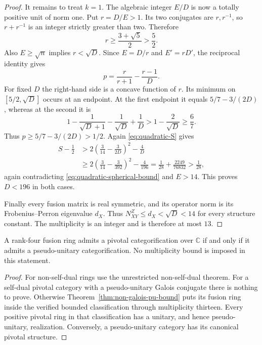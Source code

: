 \begin{proof}
It remains to treat $k=1$. The algebraic integer $E/D$ is now a
totally positive unit of norm one. Put $r=D/E>1$.
Its two conjugates are $r,r^{-1}$, so $r+r^{-1}$ is an integer
strictly greater than two. Therefore
\[
 r\geq\frac{3+\sqrt5}{2}>\frac52.
\]
Also $E\geq\sqrt n$ implies $r<\sqrt D$. Since $E=D/r$ and
$E'=rD'$, the reciprocal identity gives
\[
 p=\frac r{r+1}-\frac{r-1}{D}.
\]
For fixed $D$ the right-hand side is a concave function of $r$.
Its minimum on $[5/2,\sqrt D]$ occurs at an endpoint. At the first
endpoint it equals $5/7-3/(2D)$, whereas at the second it is
\[
 1-\frac1{\sqrt D+1}-\frac1{\sqrt D}+\frac1D
 >1-\frac2{\sqrt D}\geq\frac67.
\]
Thus $p\geq5/7-3/(2D)>1/2$. Again
\eqref{eq:quadratic-S} gives
\begin{align*}
 S-\tfrac12
 &>2\left(\frac3{14}-\frac3{2D}\right)^2-\frac4D\\
 &\geq2\left(\frac3{14}-\frac3{392}\right)^2-\frac4{196}
    =\frac1{28}+\frac{2249}{76832}>\frac1{28},
\end{align*}
again contradicting \eqref{eq:quadratic-spherical-bound} and $E>14$.
This proves $D<196$ in both cases.

Finally every fusion matrix is real symmetric, and its operator norm
is its Frobenius--Perron eigenvalue $d_X$. Thus
$N_{XY}^{Z}\leq d_X<\sqrt D<14$ for every structure constant.
The multiplicity is an integer and is therefore at most $13$.
\end{proof}

\begin{corollary}\label{cor:pivotal-pu-unrestricted}
A rank-four fusion ring admits a pivotal categorification over
$\mathbb C$ if and only if it admits a pseudo-unitary categorification.
No multiplicity bound is imposed in this statement.
\end{corollary}
\begin{proof}
For non-self-dual rings use the unrestricted non-self-dual theorem.
For a self-dual pivotal category with a pseudo-unitary Galois conjugate
there is nothing to prove. Otherwise
Theorem~\ref{thm:non-galois-pu-bound} puts its fusion ring inside the
verified bounded classification through multiplicity
thirteen. Every positive pivotal ring in that classification has a unitary,
and hence pseudo-unitary, realization. Conversely, a pseudo-unitary
category has its canonical pivotal structure.
\end{proof}

